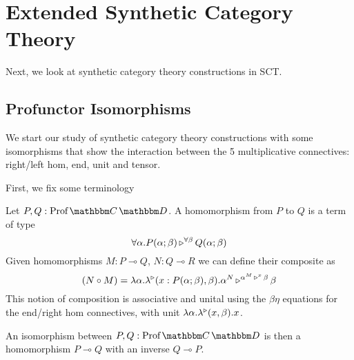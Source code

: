 \documentclass{llncs}
\begin{document}
\section{Extended Synthetic Category Theory}

Next, we look at synthetic category theory constructions in SCT.

\subsection{Profunctor Isomorphisms}

We start our study of synthetic category theory constructions with
some isomorphisms that show the interaction between the 5
multiplicative connectives: right/left hom, end, unit and tensor.

First, we fix some terminology
\begin{lemma}
  Let $P, Q : \harr {\cat C} {\cat D}$.
  A homomorphism from $P$ to $Q$ is a term of type
  \[ \forall \alpha. P(\alpha;\beta) \mathop{\triangleright^{\forall \beta}} Q(\alpha;\beta) \]
  Given homomorphisms $M : P \multimap Q$, $N : Q \multimap R$ we can define their composite as
  \[ (N \circ M) = \lambda \alpha. \lambda^\triangleright (x:P(\alpha;\beta), \beta). \alpha^{N} \mathop{\triangleright^{\alpha^{M} \mathop{\triangleright^{x}} \beta}} \beta \]
  This notion of composition is associative and unital using the
  $\beta\eta$ equations for the end/right hom connectives, with unit
  $\lambda \alpha. \lambda^\triangleright (x, \beta). x$.

  An isomorphism between $P, Q : \harr {\cat C}{\cat D}$ is then a
  homomorphism $P \multimap Q$ with an inverse $Q \multimap P$.
\end{lemma}
\end{document}
